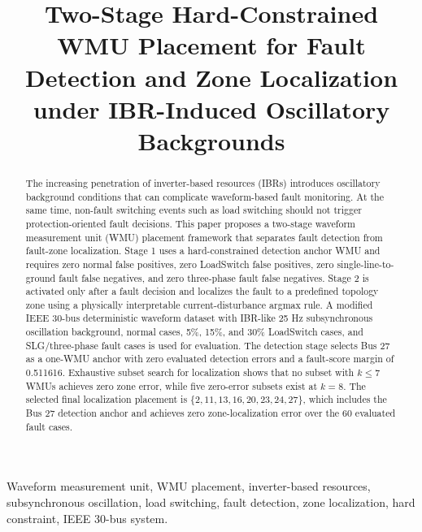 \documentclass[conference]{IEEEtran}
\begin{document}
\title{Two-Stage Hard-Constrained WMU Placement for Fault Detection and Zone Localization under IBR-Induced Oscillatory Backgrounds}

\author{%
}

\maketitle

\begin{abstract}
The increasing penetration of inverter-based resources (IBRs) introduces oscillatory background conditions that can complicate waveform-based fault monitoring. At the same time, non-fault switching events such as load switching should not trigger protection-oriented fault decisions. This paper proposes a two-stage waveform measurement unit (WMU) placement framework that separates fault detection from fault-zone localization. Stage 1 uses a hard-constrained detection anchor WMU and requires zero normal false positives, zero LoadSwitch false positives, zero single-line-to-ground fault false negatives, and zero three-phase fault false negatives. Stage 2 is activated only after a fault decision and localizes the fault to a predefined topology zone using a physically interpretable current-disturbance argmax rule. A modified IEEE 30-bus deterministic waveform dataset with IBR-like 25 Hz subsynchronous oscillation background, normal cases, 5\%, 15\%, and 30\% LoadSwitch cases, and SLG/three-phase fault cases is used for evaluation. The detection stage selects Bus 27 as a one-WMU anchor with zero evaluated detection errors and a fault-score margin of 0.511616. Exhaustive subset search for localization shows that no subset with $k\leq 7$ WMUs achieves zero zone error, while five zero-error subsets exist at $k=8$. The selected final localization placement is $\{2,11,13,16,20,23,24,27\}$, which includes the Bus 27 detection anchor and achieves zero zone-localization error over the 60 evaluated fault cases.
\end{abstract}

\begin{IEEEkeywords}
Waveform measurement unit, WMU placement, inverter-based resources, subsynchronous oscillation, load switching, fault detection, zone localization, hard constraint, IEEE 30-bus system.
\end{IEEEkeywords}
\end{document}
